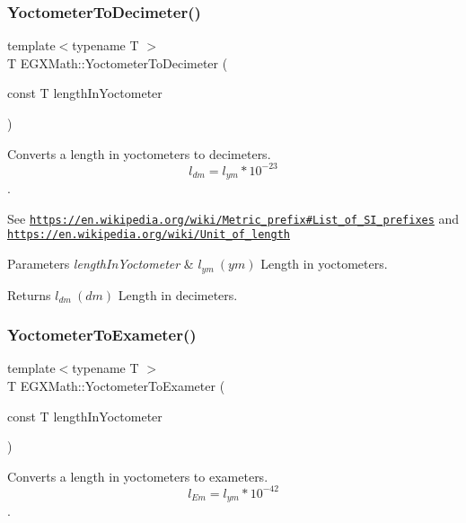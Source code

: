 \subsubsection{\texorpdfstring{Yoctometer\+To\+Decimeter()}{YoctometerToDecimeter()}}
{\footnotesize\ttfamily template$<$typename T $>$ \\
T E\+G\+X\+Math\+::\+Yoctometer\+To\+Decimeter (\begin{DoxyParamCaption}\item[{const T}]{length\+In\+Yoctometer }\end{DoxyParamCaption})}



Converts a length in yoctometers to decimeters. \[ l_{dm}=l_{ym} * 10^{-23} \]. 

See \href{https://en.wikipedia.org/wiki/Metric_prefix#List_of_SI_prefixes}{\tt https\+://en.\+wikipedia.\+org/wiki/\+Metric\+\_\+prefix\#\+List\+\_\+of\+\_\+\+S\+I\+\_\+prefixes} and \href{https://en.wikipedia.org/wiki/Unit_of_length}{\tt https\+://en.\+wikipedia.\+org/wiki/\+Unit\+\_\+of\+\_\+length} 
\begin{DoxyParams}{Parameters}
{\em length\+In\+Yoctometer} & $ l_{ym}\ (ym)$ Length in yoctometers. \\
\hline
\end{DoxyParams}
\begin{DoxyReturn}{Returns}
$ l_{dm}\ (dm)$ Length in decimeters. 
\end{DoxyReturn}
\mbox{\label{group___e_g_x_math-_conversions-_length_conversions-_s_i-_yoctometer-_s_i_ga2ffb14b252f7cc426a761de3930449a1}} 
\subsubsection{\texorpdfstring{Yoctometer\+To\+Exameter()}{YoctometerToExameter()}}
{\footnotesize\ttfamily template$<$typename T $>$ \\
T E\+G\+X\+Math\+::\+Yoctometer\+To\+Exameter (\begin{DoxyParamCaption}\item[{const T}]{length\+In\+Yoctometer }\end{DoxyParamCaption})}



Converts a length in yoctometers to exameters. \[ l_{Em}=l_{ym} * 10^{-42} \]. 

